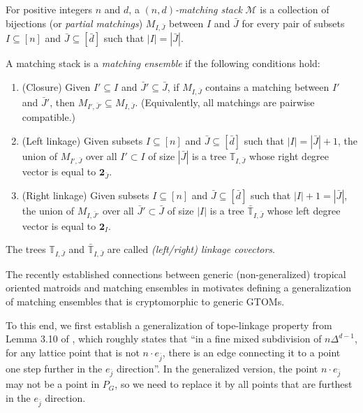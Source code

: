 \documentclass[letterpaper,reqno,11pt]{amsart}
\begin{document}
\begin{definition}\label{def:ensemble}
    For positive integers $n$ and $d$, a \emph{$(n,d)$-matching stack} $\mathcal{M}$ is a collection of bijections (or \emph{partial matchings}) $M_{I, \bar{J}}$ between $I$ and $\bar{J}$ for every pair of subsets $I\subseteq [n]$ and $\bar{J}\subseteq [\bar{d}]$ such that $|I| = |\bar{J}|$. 

    A matching stack is a \emph{matching ensemble} if the following conditions hold: \begin{enumerate}
        \item (Closure) Given $I'\subseteq I$ and $\bar{J}'\subseteq \bar{J}$, if $M_{I, \bar{J}}$ contains a matching between $I'$ and $\bar{J}'$, then $M_{I', \bar{J}'} \subseteq M_{I, \bar{J}}$. (Equivalently, all matchings are pairwise compatible.)
        \item (Left linkage) Given subsets $I\subseteq [n]$ and $\bar{J}\subseteq [\bar{d}]$ such that $|I| = |\bar{J}| + 1$, the union of $M_{I', \bar{J}}$ over all $I'\subset I$ of size $|\bar{J}|$ is a tree $\mathbb{T}_{I, \bar{J}}$ whose right degree vector is equal to $\mathbf{2}_{\bar{J}}$.
        \item (Right linkage) Given subsets $I\subseteq [n]$ and $\bar{J}\subseteq [\bar{d}]$ such that $|I| + 1 = |\bar{J}|$, the union of $M_{I, \bar{J}'}$ over all $\bar{J}'\subset \bar{J}$ of size $|I|$ is a tree $\bar{\mathbb{T}}_{I, \bar{J}}$ whose left degree vector is equal to $\mathbf{2}_{I}$.
    \end{enumerate}

    The trees $\mathbb{T}_{I, \bar{J}}$ and $\bar{\mathbb{T}}_{I, \bar{J}}$ are called \emph{(left/right) linkage covectors}.
\end{definition}

The recently established connections between generic (non-generalized) tropical oriented matroids and matching ensembles in \cite{yao2025linkage} motivates defining a generalization of matching ensembles that is cryptomorphic to generic GTOMs.

To this end, we first establish a generalization of tope-linkage property from Lemma 3.10 of \cite{oh2013ensembles}, which roughly states that ``in a fine mixed subdivision of $n\Delta^{d-1}$, for any lattice point that is not $n\cdot e_{\bar{j}}$, there is an edge connecting it to a point one step further in the $e_{\bar{j}}$ direction''. In the generalized version, the point $n\cdot e_{\bar{j}}$ may not be a point in $P_G$, so we need to replace it by all points that are furthest in the $e_{\bar{j}}$ direction.
\end{document}
